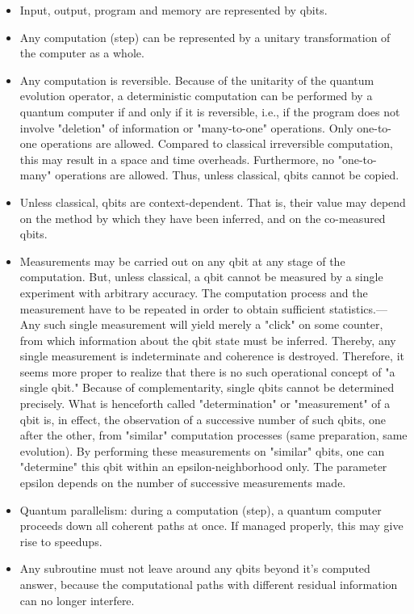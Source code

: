 \begin{itemize}
\item Input, output, program and memory are represented by qbits.

\item Any computation (step) can be represented by a unitary transformation of
the computer as a whole.

\item Any computation is reversible. Because of the unitarity of the quantum
evolution operator, a deterministic computation can be
performed by a quantum computer if and only if it is reversible, i.e., if
the program does not involve "deletion" of information or
"many-to-one" operations. Only one-to-one operations are allowed. Compared
to classical irreversible computation, this may result in a space
and time overheads. Furthermore, no "one-to-many" operations are allowed.
Thus, unless classical, qbits cannot be copied.

\item Unless classical, qbits are context-dependent. That is, their
value may
depend on the method  by which they have been inferred, and on the co-measured
qbits.

\item Measurements may be carried out on any qbit at any stage of the
computation. But, unless classical, a qbit cannot be measured by a single
experiment with arbitrary accuracy. The computation process and the
measurement have to be repeated in order to obtain sufficient
statistics.---Any such single measurement will yield merely a "click" on
some counter, from which information about the qbit state must be
inferred. Thereby, any single measurement is indeterminate and coherence
is destroyed. Therefore, it seems more proper to realize that there is no
such operational concept of "a single qbit." Because of complementarity,
single qbits cannot be determined precisely. What is henceforth called
"determination" or "measurement" of a qbit is, in effect,
the observation of a successive number of such qbits, one after the other,
from "similar" computation processes (same preparation, same evolution).
By performing these measurements on "similar" qbits, one can "determine"
this qbit within an epsilon-neighborhood only. The parameter epsilon depends on
the number of successive measurements made.

\item Quantum parallelism: during a computation (step), a quantum computer
proceeds down all coherent paths at once. If managed properly, this may
give rise to speedups.

\item Any subroutine must not leave around any qbits beyond it's computed
answer, because the computational paths with different residual
information can no longer interfere.
\end{itemize}

